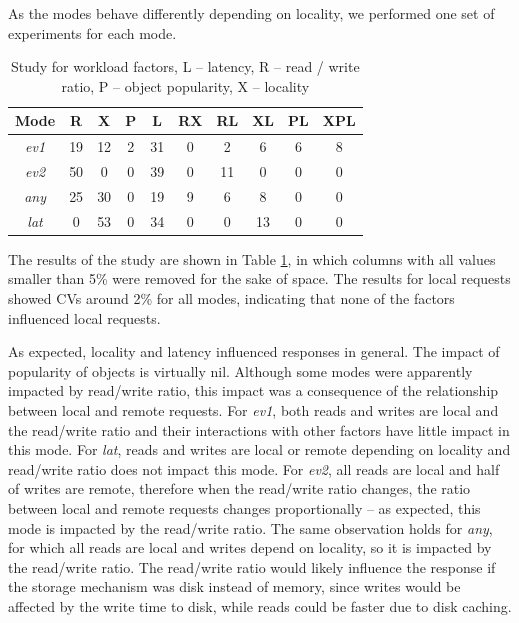 \documentclass[man,floatsintext,12pt]{apa6}
\begin{document}
As the modes behave differently depending on locality, we performed one set of
experiments for each mode.

\begin{table}[h!]
\caption{Study for workload factors, L -- latency, R -- read / write ratio, P
-- object popularity, X -- locality}
\begin{tabular}{cccccccccc} \toprule

Mode & R & X & P & L & RX & RL & XL & PL & XPL\\ \midrule

\textit{ev1} & 19 & 12 & 2 & 31 & 0 & 2 & 6 & 6 & 8\\

\textit{ev2} & 50 & 0 & 0 & 39 & 0 & 11 & 0 & 0 & 0\\

\textit{any} & 25 & 30 & 0 & 19 & 9 & 6 & 8 & 0 & 0\\

\textit{lat} & 0 & 53 & 0 & 34 & 0 & 0 & 13 & 0 & 0\\ \bottomrule

\end{tabular}
\label{tab:estudo_para_fatores_de_carga_de_trabalho}
\end{table}

The results of the study are shown in Table
\ref{tab:estudo_para_fatores_de_carga_de_trabalho}, in which columns with all
values smaller than 5\% were removed for the sake of space. The results for
local requests showed CVs around 2\% for all modes, indicating that none of the
factors influenced local requests.

As expected, locality and latency influenced responses in general. The impact
of popularity of objects is virtually nil. Although some modes were apparently
impacted by read/write ratio, this impact was a consequence of the relationship
between local and remote requests. For \textit{ev1}, both reads and writes are
local and the read/write ratio and their interactions with other factors have
little impact in this mode. For \textit{lat}, reads and writes are local or
remote depending on locality and read/write ratio does not impact this mode.
For \textit{ev2}, all reads are local and half of writes are remote, therefore
when the read/write ratio changes, the ratio between local and remote requests
changes proportionally -- as expected, this mode is impacted by the read/write
ratio. The same observation holds for \textit{any}, for which all reads are
local and writes depend on locality, so it is impacted by the read/write ratio.
The read/write ratio would likely influence the response if the storage
mechanism was disk instead of memory, since writes would be affected by the
write time to disk, while reads could be faster due to disk caching.
\end{document}

